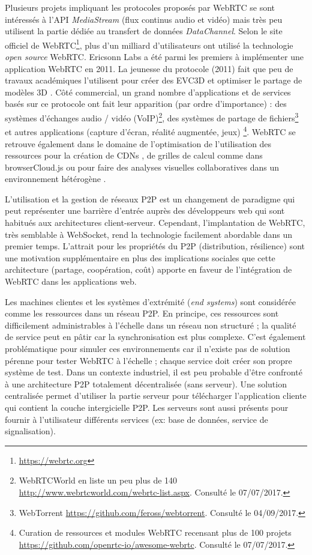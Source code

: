 Plusieurs projets impliquant les protocoles proposés par \gls{WebRTC} 
se sont intéressés à l'\gls{API} \textit{MediaStream} (flux continus audio 
et vidéo) mais très peu utilisent la partie dédiée au transfert de données 
\textit{DataChannel}. 
Selon le site officiel de WebRTC\footnote{\url{https://webrtc.org}}, plus d'un milliard 
d'utilisateurs ont utilisé la technologie \textit{open source} WebRTC. Ericsonn Labs 
a été parmi les premiers à implémenter une application WebRTC en 2011. 
La jeunesse du protocole (2011) fait que peu de travaux académiques 
l'utilisent pour créer des \gls{EVC3D} \cite{Desprat2015a,Steiakaki2016} et 
optimiser le partage de modèles 3D \cite{Koskela2014}. 
Côté commercial, un grand nombre d'applications et de services 
basés sur ce protocole ont fait leur apparition (par ordre d'importance) : 
des systèmes d'échanges audio / vidéo (VoIP)\footnote{WebRTCWorld en 
	liste un peu plus de 140 
	\url{http://www.webrtcworld.com/webrtc-list.aspx}. Consulté le 
	07/07/2017.}, des systèmes de partage de fichiers\footnote{WebTorrent 
	\url{https://github.com/feross/webtorrent}. Consulté le 04/09/2017.} et 
autres applications (capture d'écran, réalité augmentée, jeux)
\footnote{Curation de ressources et modules WebRTC 
	recensant plus de 100 projets 
	\url{https://github.com/openrtc-io/awesome-webrtc}. Consulté le 
	07/07/2017.}. WebRTC se retrouve également dans le domaine de l'optimisation 
	de l'utilisation des ressources pour la création de \glspl{CDN} 
	\cite{Zhang2013b}, de grilles de calcul comme dans
	browserCloud.js \cite{Dias2015a} ou pour faire des analyses visuelles 
	collaboratives dans un environnement hétérogène \cite{Li2015}.


L'utilisation et la gestion de réseaux \gls{P2P} est un changement de paradigme 
qui peut représenter une 
barrière d'entrée auprès des développeurs web qui sont habitués aux architectures 
client-serveur. 
Cependant, l'implantation de WebRTC, très semblable à WebSocket, rend la 
technologie facilement abordable dans un premier temps. L'attrait pour les 
propriétés du \gls{P2P} (distribution, résilience) sont une motivation 
supplémentaire en plus des implications sociales que cette architecture (partage, 
coopération, coût) apporte en faveur de l'intégration de WebRTC dans les 
applications web.

Les machines clientes et les systèmes d'extrémité (\textit{end systems}) 
sont considérée comme \og les ressources\fg{} dans un réseau 
\gls{P2P}. 
En principe, ces ressources sont difficilement administrables à l'échelle 
dans un réseau non structuré ; la qualité de service peut en pâtir car la 
synchronisation est plus complexe. C'est également problématique pour simuler 
ces environnements car il n'existe pas de solution pérenne pour tester WebRTC à 
l'échelle ; chaque service doit créer son propre système de test. 
Dans un contexte industriel, il est peu probable d'être confronté à une architecture 
\gls{P2P} totalement décentralisée (sans serveur). Une solution centralisée permet 
d'utiliser la partie serveur pour télécharger l'application cliente qui contient la 
couche intergicielle \gls{P2P}. 
Les serveurs sont aussi présents pour fournir à l'utilisateur différents services (ex: 
base de données, service de signalisation). 

